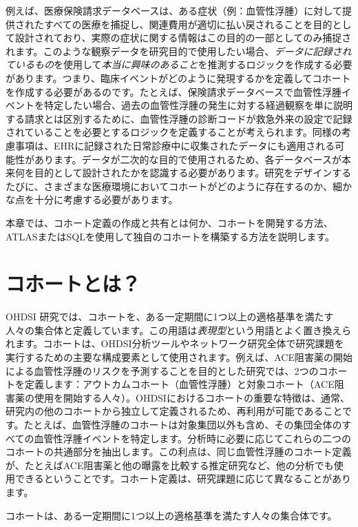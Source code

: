 \documentclass[
  11pt]{book}
\makeatletter
\newenvironment{kframe}{%
\medskip{}
\setlength{\fboxsep}{.8em}
 \def\at@end@of@kframe{}%
 \ifinner\ifhmode%
  \def\at@end@of@kframe{\end{minipage}}%
  \begin{minipage}{\columnwidth}%
 \fi\fi%
 \def\FrameCommand##1{\hskip\@totalleftmargin \hskip-\fboxsep
 \colorbox{myShadeColor}{##1}\hskip-\fboxsep
     \hskip-\linewidth \hskip-\@totalleftmargin \hskip\columnwidth}%
 \MakeFramed {\advance\hsize-\width
   \@totalleftmargin\z@ \linewidth\hsize
   \@setminipage}}%
 {\par\unskip\endMakeFramed%
 \at@end@of@kframe}
\newenvironment{rmdblock}[1]
  {
  \begin{itemize}
  \renewcommand{\labelitemi}{
    \raisebox{-.7\height}[0pt][0pt]{
      {\setkeys{Gin}{width=3em,keepaspectratio}\texttt{[image: images/\#1]}}
    }
  }
  \setlength{\fboxsep}{1em}
  \begin{kframe}
  \item
  }
  {
  \end{kframe}
  \end{itemize}
  }
\newenvironment{rmdimportant}
  {\begin{rmdblock}{important}}
  {\end{rmdblock}}
\theoremstyle{definition}
\theoremstyle{definition}
\theoremstyle{definition}
\theoremstyle{definition}
\theoremstyle{remark}
\makeatother
\begin{document}
例えば、医療保険請求データベースは、ある症状（例：血管性浮腫）に対して提供されたすべての医療を捕捉し、関連費用が適切に払い戻されることを目的として設計されており、実際の症状に関する情報はこの目的の一部としてのみ捕捉されます。このような観察データを研究目的で使用したい場合、\emph{データに記録されているもの}を使用して\emph{本当に興味のあること}を推測するロジックを作成する必要があります。つまり、臨床イベントがどのように発現するかを定義してコホートを作成する必要があるのです。たとえば、保険請求データベースで血管性浮腫イベントを特定したい場合、過去の血管性浮腫の発生に対する経過観察を単に説明する請求とは区別するために、血管性浮腫の診断コードが救急外来の設定で記録されていることを必要とするロジックを定義することが考えられます。同様の考慮事項は、EHRに記録された日常診療中に収集されたデータにも適用される可能性があります。データが二次的な目的で使用されるため、各データベースが本来何を目的として設計されたかを認識する必要があります。研究をデザインするたびに、さまざまな医療環境においてコホートがどのように存在するのか、細かな点を十分に考慮する必要があります。

本章では、コホート定義の作成と共有とは何か、コホートを開発する方法、ATLASまたはSQLを使用して独自のコホートを構築する方法を説明します。

\section{コホートとは？}\label{ux30b3ux30dbux30fcux30c8ux3068ux306f}

OHDSI 研究では、コホートを、ある一定期間に1つ以上の適格基準を満たす人々の集合体と定義しています。この用語は\emph{表現型}という用語とよく置き換えられます。コホートは、OHDSI分析ツールやネットワーク研究全体で研究課題を実行するための主要な構成要素として使用されます。例えば、ACE阻害薬の開始による血管性浮腫のリスクを予測することを目的とした研究では、2つのコホートを定義します：アウトカムコホート（血管性浮腫）と対象コホート（ACE阻害薬の使用を開始する人々）。OHDSIにおけるコホートの重要な特徴は、通常、研究内の他のコホートから独立して定義されるため、再利用が可能であることです。たとえば、血管性浮腫のコホートは対象集団以外も含め、その集団全体のすべての血管性浮腫イベントを特定します。分析時に必要に応じてこれらの二つのコホートの共通部分を抽出します。この利点は、同じ血管性浮腫のコホート定義が、たとえばACE阻害薬と他の曝露を比較する推定研究など、他の分析でも使用できるということです。コホート定義は、研究課題に応じて異なることがあります。

\begin{rmdimportant}
コホートは、ある一定期間に1つ以上の適格基準を満たす人々の集合体です。
\end{rmdimportant}
\end{document}
